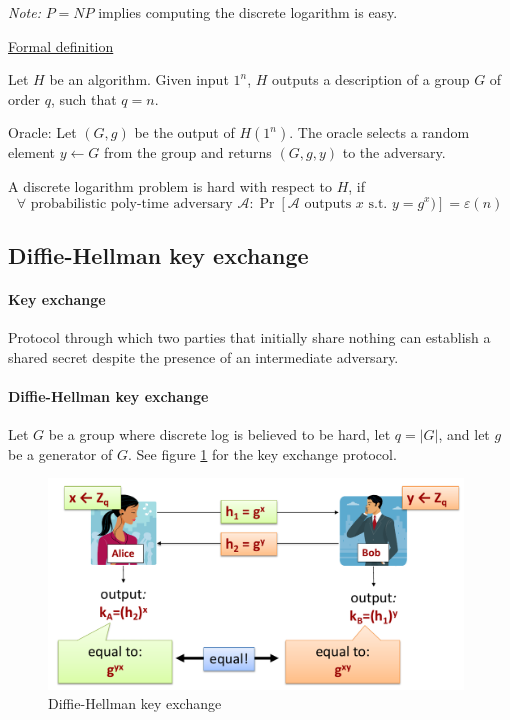 \textit{Note:} $P = NP$ implies computing the discrete logarithm is easy.

\underline{Formal definition}

Let $H$ be an algorithm. Given input $1^n$, $H$ outputs a description of a group $G$ of order $q$, such that $q = n$.

Oracle: Let $(G, g)$ be the output of $H(1^n)$. The oracle selects a random element $y \leftarrow G$ from the group and returns $(G, g, y)$ to the adversary.

A discrete logarithm problem is hard with respect to $H$, if
$$\forall \text{ probabilistic poly-time adversary } \mathcal{A}: \Pr[\mathcal{A} \text{ outputs } x \text{ s.t. } y = g^x)] = \varepsilon(n)$$


\subsection{Diffie-Hellman key exchange}\label{section-dh-exchange}

\paragraph{Key exchange} Protocol through which two parties that initially share nothing can establish a shared secret despite the presence of an intermediate adversary.

\paragraph{Diffie-Hellman key exchange} Let $G$ be a group where discrete log is believed to be hard, let $q = |G|$, and let $g$ be a generator of $G$. See figure \ref{fig:dh} for the key exchange protocol.

\begin{figure}[h]
    \centering
    \includegraphics[width=11cm]{images/ch5-dh.png}
    \caption{Diffie-Hellman key exchange}
    \label{fig:dh}
\end{figure}

